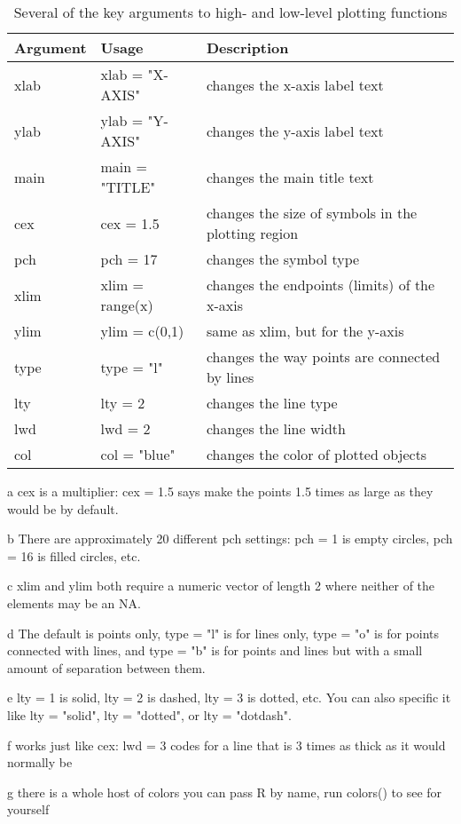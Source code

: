 \documentclass[]{book}
\theoremstyle{definition}
\theoremstyle{definition}
\theoremstyle{definition}
\theoremstyle{remark}
\begin{document}
\begin{table}

\caption{\label{tab:plot-arg-table-pdf}Several of the key arguments to high- and low-level plotting functions}
\centering
\begin{threeparttable}
\begin{tabular}[t]{>{\ttfamily}l>{\ttfamily}l>{\raggedright\arraybackslash}p{25em}}
\toprule
Argument & Usage & Description\\
\midrule
xlab & xlab = "X-AXIS" & changes the x-axis label text\\
ylab & ylab = "Y-AXIS" & changes the y-axis label text\\
main & main = "TITLE" & changes the main title text\\
cex & cex = 1.5 & changes the size of symbols in the plotting region\\
pch & pch = 17 & changes the symbol type\\
\addlinespace
xlim & xlim = range(x) & changes the endpoints (limits) of the x-axis\\
ylim & ylim = c(0,1) & same as xlim, but for the y-axis\\
type & type = "l" & changes the way points are connected by lines\\
lty & lty = 2 & changes the line type\\
lwd & lwd = 2 & changes the line width\\
col & col = "blue" & changes the color of plotted objects\\
\bottomrule
\end{tabular}
\begin{tablenotes}
\item[a] cex is a multiplier: cex = 1.5 says make the points 1.5 times as large as they would be by default.
\item[b] There are approximately 20 different pch settings: pch = 1 is empty circles, pch = 16 is filled circles, etc.
\item[c] xlim and ylim both require a numeric vector of length 2 where neither of the elements may be an NA.
\item[d] The default is points only, type = "l" is for lines only, type = "o" is for points connected with lines, and type = "b" is for points and lines but with a small amount of separation between them.
\item[e] lty = 1 is solid, lty = 2 is dashed, lty = 3 is dotted, etc. You can also specific it like lty = "solid", lty = "dotted", or lty = "dotdash".
\item[f] works just like cex: lwd = 3 codes for a line that is 3 times as thick as it would normally be
\item[g] there is a whole host of colors you can pass R by name, run colors() to see for yourself
\end{tablenotes}
\end{threeparttable}
\end{table}
\end{document}
